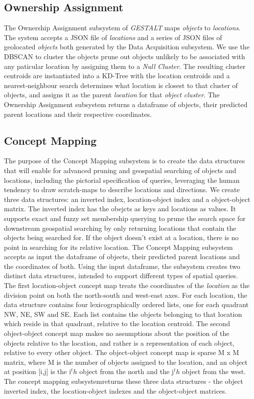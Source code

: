\subsection{Ownership Assignment}
The Ownership Assignment subsystem of \emph{GESTALT} maps \textit{objects} to \textit{locations}. 
The system accepts a JSON file of \textit{locations} and a series of JSON files of geolocated \textit{objects} both generated by the Data Acquisition subsystem. 
We use the DBSCAN  to cluster the objects prune out objects unlikely to be associated with any paticular location by assigning them to a \textit{Null Cluster}. 
The resulting cluster centroids are instantiated into a KD-Tree with the location centroids and a nearest-neighbour search determines what location is closest to that cluster of objects, and assigns it as the parent \textit{location} for that \textit{object cluster}.
The Ownership Assignment subsystem returns a dataframe of objects, their predicted parent locations and their respective coordinates. 

\subsection{Concept Mapping}
The purpose of the Concept Mapping subsystem is to create the data structures that will enable for advanced pruning and  geospatial searching of objects and locations, including the pictorial specification of queries, leveraging the human tendency to draw scratch-maps to describe locations and directions. 
We create three data structures: an inverted index, location-object index and a object-object matrix. 
The inverted index has the obejcts as keys and locations as values. It supports exact and fuzzy set membership querying to prune the search space for downstream geospatial searching by only returning locations that contain the objects being searched for. If the object doesn't exist at a location, there is no point in searching for its relative location.
The Concept Mapping subsystem accepts as input the dataframe of objects, their predicted parent locations and the coordinates of both. 
Using the input dataframe, the subsystem creates two distinct data structures, intended to support different types of spatial queries. 
The first location-object concept map treats the coordinates of the \textit{location} as the division point on both the north-south and west-east axes. 
For each location, the data structure contains four lexicographically ordered lists, one for each quadrant NW, NE, SW and SE. 
Each list contains the objects belonging to that location which reside in that quadrant, relative to the location centroid. 
The second object-object concept map makes no assumptions about the position of the objects relative to the location, and rather is a representation of each object, relative to every other object. 
The object-object concept map is sparse M x M matrix, where M is the number of objects assigned to the location, and an object at position [i,j] is the i$^th$ object from the north and the j$^th$ object from the west. 
The concept mapping subsystemreturns these three data structures - the object inverted index, the location-object indexes and the object-object matrices. 

